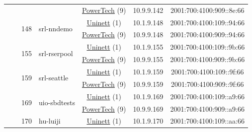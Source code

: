 \begin{small}
\begin{center}
\begin{longtable}{|c|c|c|c|c|c|c|c|}
  &  &  &  & \multicolumn{2}{|c|}{\tiny{\href{http://www.powertech.no}{PowerTech} (9)}} & \tiny{10.9.9.142} & \tiny{2001:700:4100:909::8e:66} \\* \cline{3-3}\cline{4-4}\cline{5-5}\cline{6-6}\cline{7-7}\cline{8-8}
  &  & \multirow{2}{*}{\tiny{148}} & \multicolumn{1}{|l|}{\multirow{2}{*}{\tiny{srl-nndemo}}} & \multicolumn{2}{|c|}{\tiny{\href{https://www.uninett.no}{Uninett} (1)}} & \tiny{10.1.9.148} & \tiny{2001:700:4100:109::94:66} \\* \cline{5-5}\cline{6-6}\cline{7-7}\cline{8-8}
  &  &  &  & \multicolumn{2}{|c|}{\tiny{\href{http://www.powertech.no}{PowerTech} (9)}} & \tiny{10.9.9.148} & \tiny{2001:700:4100:909::94:66} \\* \cline{3-3}\cline{4-4}\cline{5-5}\cline{6-6}\cline{7-7}\cline{8-8}
  &  & \multirow{2}{*}{\tiny{155}} & \multicolumn{1}{|l|}{\multirow{2}{*}{\tiny{srl-rserpool}}} & \multicolumn{2}{|c|}{\tiny{\href{https://www.uninett.no}{Uninett} (1)}} & \tiny{10.1.9.155} & \tiny{2001:700:4100:109::9b:66} \\* \cline{5-5}\cline{6-6}\cline{7-7}\cline{8-8}
  &  &  &  & \multicolumn{2}{|c|}{\tiny{\href{http://www.powertech.no}{PowerTech} (9)}} & \tiny{10.9.9.155} & \tiny{2001:700:4100:909::9b:66} \\* \cline{3-3}\cline{4-4}\cline{5-5}\cline{6-6}\cline{7-7}\cline{8-8}
  &  & \multirow{2}{*}{\tiny{159}} & \multicolumn{1}{|l|}{\multirow{2}{*}{\tiny{srl-seattle}}} & \multicolumn{2}{|c|}{\tiny{\href{https://www.uninett.no}{Uninett} (1)}} & \tiny{10.1.9.159} & \tiny{2001:700:4100:109::9f:66} \\* \cline{5-5}\cline{6-6}\cline{7-7}\cline{8-8}
  &  &  &  & \multicolumn{2}{|c|}{\tiny{\href{http://www.powertech.no}{PowerTech} (9)}} & \tiny{10.9.9.159} & \tiny{2001:700:4100:909::9f:66} \\* \cline{3-3}\cline{4-4}\cline{5-5}\cline{6-6}\cline{7-7}\cline{8-8}
  &  & \multirow{2}{*}{\tiny{169}} & \multicolumn{1}{|l|}{\multirow{2}{*}{\tiny{uio-sbdtests}}} & \multicolumn{2}{|c|}{\tiny{\href{https://www.uninett.no}{Uninett} (1)}} & \tiny{10.1.9.169} & \tiny{2001:700:4100:109::a9:66} \\* \cline{5-5}\cline{6-6}\cline{7-7}\cline{8-8}
  &  &  &  & \multicolumn{2}{|c|}{\tiny{\href{http://www.powertech.no}{PowerTech} (9)}} & \tiny{10.9.9.169} & \tiny{2001:700:4100:909::a9:66} \\* \cline{3-3}\cline{4-4}\cline{5-5}\cline{6-6}\cline{7-7}\cline{8-8}
  &  & \multirow{2}{*}{\tiny{170}} & \multicolumn{1}{|l|}{\multirow{2}{*}{\tiny{hu-luiji}}} & \multicolumn{2}{|c|}{\tiny{\href{https://www.uninett.no}{Uninett} (1)}} & \tiny{10.1.9.170} & \tiny{2001:700:4100:109::aa:66} \\* \cline{5-5}\cline{6-6}\cline{7-7}\cline{8-8}

\end{longtable}
\end{center}
\end{small}

